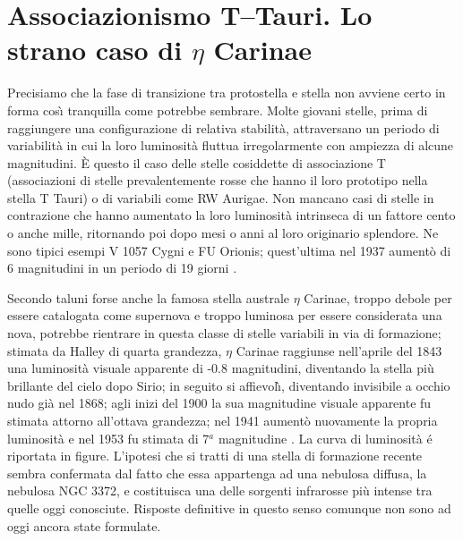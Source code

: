 \section{Associazionismo T--Tauri. Lo strano caso di $\eta$ Carinae}
Precisiamo che la fase di transizione tra protostella e stella non avviene certo in forma cos\`{\i}{} tranquilla come potrebbe sembrare.
Molte giovani stelle, prima di raggiungere una configurazione di relativa stabilit\`{a}, attraversano un periodo di variabilit\`{a} in cui la loro luminosit\`{a} fluttua irregolarmente con ampiezza di alcune magnitudini. \`E questo il caso delle stelle cosiddette di associazione T (associazioni di stelle prevalentemente rosse che hanno il loro prototipo nella stella T Tauri) o di variabili come RW Aurigae.
Non mancano casi di stelle in contrazione che hanno aumentato la loro luminosit\`{a} intrinseca di un fattore cento o anche mille, ritornando poi dopo mesi o anni al loro originario splendore. Ne sono tipici esempi V 1057 Cygni e FU Orionis; quest'ultima nel 1937 aumentò di 6 magnitudini in un periodo di 19 giorni \Cite{rosino}.
\par
Secondo taluni forse anche la famosa stella australe $\eta$ Carinae, troppo debole per essere catalogata come supernova e troppo luminosa per essere considerata una nova, potrebbe rientrare in questa classe di stelle variabili in via di formazione; stimata da Halley di quarta grandezza, $\eta$ Carinae raggiunse nell'aprile del 1843 una luminosit\`{a} visuale apparente di -0.8 magnitudini, diventando la stella più brillante del cielo dopo Sirio; in seguito si affievol\`{\i}{}, diventando invisibile a occhio nudo gi\`{a} nel 1868; agli inizi del 1900 la sua magnitudine visuale apparente fu stimata attorno all'ottava grandezza; nel 1941 aumentò nuovamente la propria luminosit\`{a} e nel 1953 fu stimata di 7$^{a}$ magnitudine \Cite{burn}.
La curva di luminosit\`a \'e riportata in figure. 
L'ipotesi che si tratti di una stella di formazione recente sembra confermata dal fatto che essa appartenga ad una nebulosa diffusa, la nebulosa NGC 3372, e costituisca una delle sorgenti infrarosse più intense tra quelle oggi conosciute. Risposte definitive in questo senso comunque non sono ad oggi ancora state formulate.



